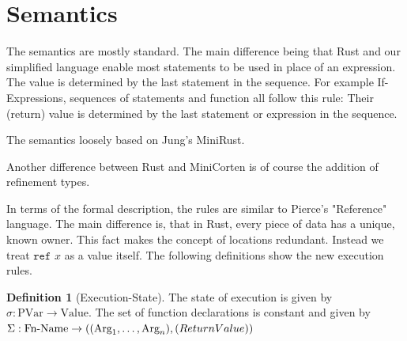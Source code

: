 \documentclass{book}
\newcommand{\code}[1]{\texttt{#1}}
\theoremstyle{definition}
\newtheorem{definition}[theorem]{Definition}
\begin{document}
\section{Semantics}

The semantics are mostly standard. The main difference being that Rust and our simplified language enable most statements to be used in place of an expression. The value is determined by the last statement in the sequence. For example If-Expressions, sequences of statements and function all follow this rule: Their (return) value is determined by the last statement or expression in the sequence.

The semantics loosely based on Jung's MiniRust.

Another difference between Rust and MiniCorten is of course the addition of refinement types.

In terms of the formal description, the rules are similar to Pierce's \cite[p. 166f]{pierce_types_2002-3} "Reference" language. %
The main difference is, that in Rust, every piece of data has a unique, known owner. This fact makes the concept of locations redundant. Instead we treat $\code{ref } x$ as a value itself. The following definitions show the new execution rules.

\begin{definition}[Execution-State]
  The state of execution is given by $\sigma : \text{PVar} \to \text{Value}$. The set of function declarations is constant and given by $\Sigma : \text{Fn-Name} \to ((\text{Arg}_1, \dots, \text{Arg}_n), \text(ReturnValue))$
\end{definition}
\end{document}
